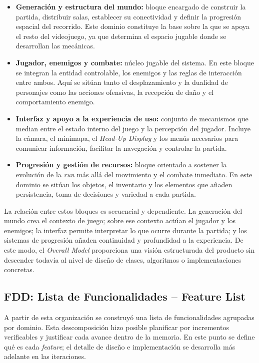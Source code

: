 \begin{itemize}
    \item \textbf{Generación y estructura del mundo:} bloque encargado de construir la
    partida, distribuir salas, establecer su conectividad y definir la progresión espacial
    del recorrido. Este dominio constituye la base sobre la que se apoya el resto del
    videojuego, ya que determina el espacio jugable donde se desarrollan las mecánicas.
    \item \textbf{Jugador, enemigos y combate:} núcleo jugable del sistema. En este bloque
    se integran la entidad controlable, los enemigos y las reglas de interacción entre
    ambos. Aquí se sitúan tanto el desplazamiento y la dualidad de personajes como las
    acciones ofensivas, la recepción de daño y el comportamiento enemigo.
    \item \textbf{Interfaz y apoyo a la experiencia de uso:} conjunto de mecanismos que
    median entre el estado interno del juego y la percepción del jugador. Incluye la
    cámara, el minimapa, el \textit{Head-Up Display} y los menús necesarios para
    comunicar información, facilitar la navegación y controlar la partida.
    \item \textbf{Progresión y gestión de recursos:} bloque orientado a sostener la
    evolución de la \textit{run} más allá del movimiento y el combate inmediato. En este
    dominio se sitúan los objetos, el inventario y los elementos que añaden persistencia,
    toma de decisiones y variedad a cada partida.
\end{itemize}

La relación entre estos bloques es secuencial y dependiente. La generación del mundo crea
el contexto de juego; sobre ese contexto actúan el jugador y los enemigos; la interfaz
permite interpretar lo que ocurre durante la partida; y los sistemas de progresión añaden
continuidad y profundidad a la experiencia. De este modo, el \textit{Overall Model}
proporciona una visión estructurada del producto sin descender todavía al nivel de diseño
de clases, algoritmos o implementaciones concretas.

\subsection{FDD: Lista de Funcionalidades -- Feature List}
A partir de esta organización se construyó una lista de funcionalidades agrupadas por
dominio. Esta descomposición hizo posible planificar por incrementos verificables y
justificar cada avance dentro de la memoria. En este punto se define qué es cada
\textit{feature}; el detalle de diseño e implementación se desarrolla más adelante en las
iteraciones.

